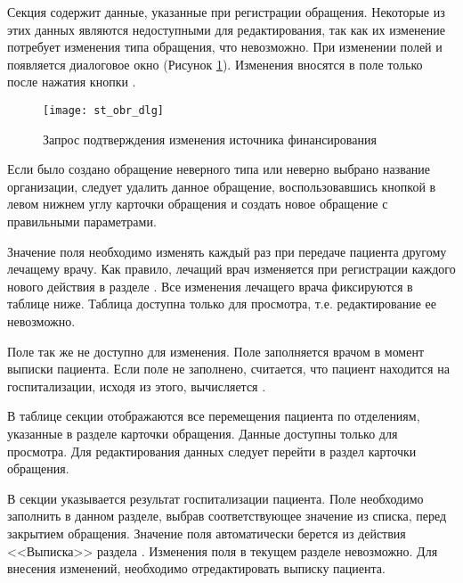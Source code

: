 Секция  содержит данные, указанные при регистрации обращения. Некоторые из этих данных являются недоступными для редактирования, так как их изменение потребует изменения типа обращения, что невозможно. При изменении полей  и  появляется диалоговое окно (Рисунок \ref{img_st_obr_dlg}). Изменения вносятся в поле только после нажатия кнопки .

\begin{figure}[ht]\centering
   \texttt{[image: st\_obr\_dlg]}
   \caption{Запрос подтверждения изменения источника финансирования}
   \label{img_st_obr_dlg}
\end{figure}

\begin{prim}
 Если было создано обращение неверного типа или неверно выбрано название организации, следует удалить данное обращение, воспользовавшись кнопкой  в левом нижнем углу карточки обращения и создать новое обращение с правильными параметрами.
\end{prim} 

Значение поля  необходимо изменять каждый раз при передаче пациента другому лечащему врачу. Как правило, лечащий врач изменяется при регистрации каждого нового действия в разделе . Все изменения лечащего врача фиксируются в таблице ниже. Таблица доступна только для просмотра, т.е. редактирование ее невозможно.

Поле  так же не доступно для изменения. Поле  заполняется врачом в момент выписки пациента. Если поле  не заполнено, считается, что пациент находится на госпитализации, исходя из этого, вычисляется .

В таблице секции  отображаются все перемещения пациента по отделениям, указанные в разделе  карточки обращения. Данные доступны только для просмотра. Для редактирования данных следует перейти в раздел  карточки обращения.

В секции  указывается результат госпитализации пациента. Поле  необходимо заполнить в данном разделе, выбрав соответствующее значение из списка, перед закрытием обращения. Значение поля  автоматически берется из действия <<Выписка>> раздела . Изменения поля  в текущем разделе невозможно. Для внесения изменений, необходимо отредактировать выписку пациента.

